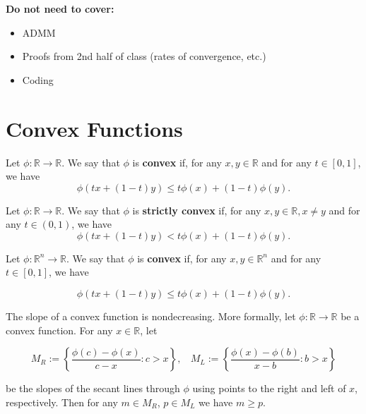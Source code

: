 \textbf{Do not need to cover:}

\begin{itemize}

\item ADMM

\item Proofs from 2nd half of class (rates of convergence, etc.)

\item Coding

\end{itemize}

\section{Convex Functions}\label{cvx.sec.jensen.etc}

\begin{definition}\label{cvx.defn.convex} Let $\phi:\mathbb{R}\to\mathbb{R}$.  We say that $\phi$ is \textbf{convex} if, for any $x,y\in\mathbb{R}$ and for any $t\in[0,1]$, we have
$$\phi(tx+(1-t)y)\leq t\phi(x)+(1-t)\phi(y).$$

\end{definition}

\begin{definition}\label{cvx.defn.strictly.convex} Let $\phi:\mathbb{R}\to\mathbb{R}$.  We say that $\phi$ is \textbf{strictly convex} if, for any $x,y\in\mathbb{R}, x \neq y$ and for any $t\in(0,1)$, we have
$$\phi(tx+(1-t)y)< t\phi(x)+(1-t)\phi(y).$$

\end{definition}

\begin{definition}\label{cvx.defn.convex.multivar} Let $\phi:\mathbb{R}^n\to\mathbb{R}$.  We say that $\phi$ is \textbf{convex} if, for any $x,y\in\mathbb{R}^n$ and for any $t\in[0,1]$, we have

\begin{equation}\label{cvx.541a.hw6.5a}
\phi(tx+(1-t)y)\leq t\phi(x)+(1-t)\phi(y).
\end{equation}

\end{definition}

\begin{lemma}\label{cvx.slope.nondec} The slope of a convex function is nondecreasing. More formally, let \(\phi: \mathbb{R} \to \mathbb{R}\) be a convex function. For any \(x \in \mathbb{R}\), let 

\[
M_R:= \left\{ \frac{\phi(c) - \phi(x) }{c-x}  : c > x\right\}, \ \ \ \ M_L:= \left\{ \frac{\phi(x) - \phi(b) }{x - b}  : b > x\right\}
\]

be the slopes of the secant lines through \(\phi\) using points to the right and left of \(x\), respectively. Then for any \(m \in M_R\), \(p \in M_L\) we have \(m \geq p\).

\end{lemma}


